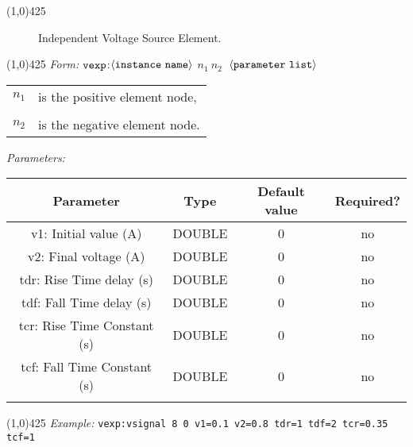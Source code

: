 \documentclass{article}
\begin{document}
\hrulefill\linethickness{0.5mm}\line(1,0){425}
\normalsize
\newline
\begin{figure}[h]
\centerline{\epsfxsize=0.5in}
\caption{Independent Voltage Source Element.}
\end{figure}
\newline
\linethickness{0.5mm} \line(1,0){425}
\newline
\textit{Form:}
\newline
$\tt vexp$:$\langle \tt{instance\ name}\rangle$ $n_1\ n_2\ $
$\langle \tt{parameter\ list}\rangle$
\newline
\begin{tabular}{r l}
$n_1$ & is the positive element node, \\
&  \\
$n_2$ & is the negative element node. \\
\end{tabular}
\newline
\textit{Parameters:}
\begin{table}[H]
\begin{tabular}{|c|c|c|c|}
\hline
Parameter&Type&Default value&Required?\\
\hline
v1: Initial value (A) & DOUBLE & 0 & no\\
\hline
v2: Final voltage (A) & DOUBLE & 0 & no\\
\hline
tdr: Rise Time delay (s) & DOUBLE & 0 & no\\
\hline
tdf: Fall Time delay (s) & DOUBLE & 0 & no\\
\hline
tcr: Rise Time Constant (s) & DOUBLE & 0 & no\\
\hline
tcf: Fall Time Constant (s) & DOUBLE & 0 & no\\
\par
\hline
\end{tabular}
\end{table}
\noindent\linethickness{0.5mm}\line(1,0){425}
\newline
\textit{Example:}
\newline
\texttt{vexp:vsignal\ 8\ 0\ v1=0.1 v2=0.8 tdr=1 tdf=2 tcr=0.35
tcf=1}
\end{document}

